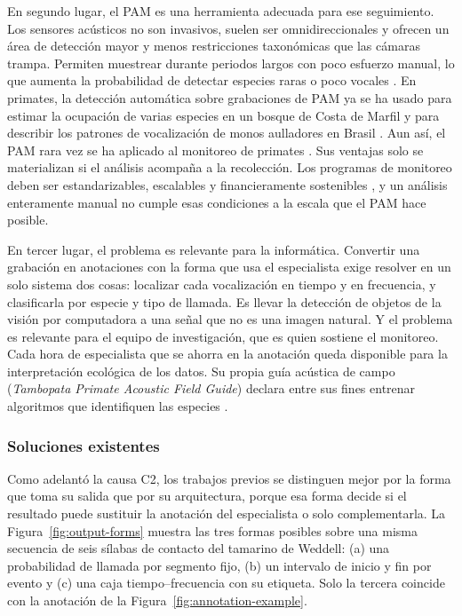 En segundo lugar, el PAM es una herramienta adecuada para ese seguimiento. Los
sensores acústicos no son invasivos, suelen ser omnidireccionales y ofrecen un
área de detección mayor y menos restricciones taxonómicas que las cámaras
trampa. Permiten muestrear durante periodos largos con poco esfuerzo manual, lo
que aumenta la probabilidad de detectar especies raras o poco vocales
\citep{gibb_2018}. En primates, la detección automática sobre grabaciones de PAM
ya se ha usado para estimar la ocupación de varias especies en un bosque de Costa
de Marfil \citep{kalan_towards_2015} y para describir los patrones de
vocalización de monos aulladores en Brasil
\citep{perez-granados_passive_2021,do_nascimento_passive_2021}. Aun así, el PAM
rara vez se ha aplicado al monitoreo de primates
\citep{perez-granados_passive_2021}. Sus ventajas solo se materializan si el
análisis acompaña a la recolección. Los programas de monitoreo deben ser
estandarizables, escalables y financieramente sostenibles \citep{gibb_2018}, y un
análisis enteramente manual no cumple esas condiciones a la escala que el PAM
hace posible.

En tercer lugar, el problema es relevante para la informática. Convertir una
grabación en anotaciones con la forma que usa el especialista exige resolver en un
solo sistema dos cosas: localizar cada vocalización en tiempo y en frecuencia, y
clasificarla por especie y tipo de llamada. Es llevar la detección de objetos de
la visión por computadora a una señal que no es una imagen natural. Y el problema
es relevante para el equipo de investigación, que es quien sostiene el monitoreo.
Cada hora de especialista que se ahorra en la anotación queda disponible para la
interpretación ecológica de los datos. Su propia guía acústica de campo
(\textit{Tambopata Primate Acoustic Field Guide}) declara entre sus fines entrenar
algoritmos que identifiquen las especies \citep{proyecto8_guia_2025}.

\subsubsection{Soluciones existentes}
\label{sec:soluciones}

Como adelantó la causa C2, los trabajos previos se distinguen mejor por la forma
que toma su salida que por su arquitectura, porque esa forma decide si el resultado puede sustituir la
anotación del especialista o solo complementarla. La
Figura~\ref{fig:output-forms} muestra las tres formas posibles sobre una misma
secuencia de seis sílabas de contacto del tamarino de Weddell: (a) una
probabilidad de llamada por segmento fijo, (b) un intervalo de inicio y fin por
evento y (c) una caja tiempo--frecuencia con su etiqueta. Solo la tercera
coincide con la anotación de la Figura~\ref{fig:annotation-example}.

